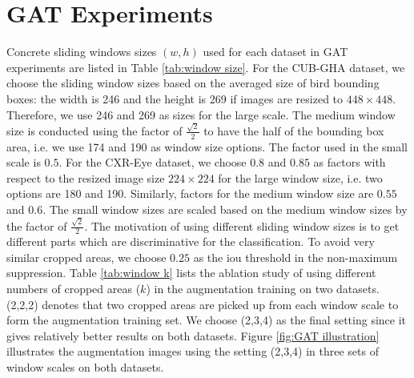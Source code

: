 \documentclass{bmvc2k}
\begin{document}
\section{GAT Experiments}
\begin{table}[h]
\centering
{}
\vspace{0.5cm}
\caption{Sliding window size used in GAT.}
\label{tab:window size}
\end{table}

Concrete sliding windows sizes $(w,h)$ used for each dataset in GAT experiments are listed in Table \ref{tab:window size}. For the CUB-GHA dataset, we choose the sliding window sizes based on the averaged size of bird bounding boxes: the width is 246 and the height is 269 if images are resized to $448 \times 448$. Therefore, we use 246 and 269 as sizes for the large scale. The medium window size is conducted using the factor of $\frac{\sqrt{2}}{2}$ to have the half of the bounding box area, i.e. we use 174 and 190 as window size options. The factor used in the small scale is $0.5$. For the CXR-Eye dataset, we choose $0.8$ and $0.85$ as factors with respect to the resized image size $224 \times 224$ for the large window size, i.e. two options are 180 and 190. Similarly, factors for the medium window size are $0.55$ and $0.6$. The small window sizes are scaled based on the medium window sizes by the factor of $\frac{\sqrt{2}}{2}$. The motivation of using different sliding window sizes is to get different parts which are discriminative for the classification. To avoid very similar cropped areas, we choose $0.25$ as the iou threshold in the non-maximum suppression. Table \ref{tab:window k} lists the ablation study of using different numbers of cropped areas ($k$) in the augmentation training on two datasets. (2,2,2) denotes that two cropped areas are picked up from each window scale to form the augmentation training set. We choose (2,3,4) as the final setting since it gives relatively better results on both datasets. Figure \ref{fig:GAT illustration} illustrates the augmentation images using the setting (2,3,4) in three sets of window scales on both datasets. 
\end{document}
